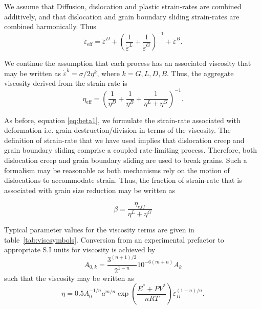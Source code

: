 \documentclass[a4paper]{article}
\newcommand{\strr}{\dot{\varepsilon}}
\begin{document}
We assume that Diffusion, dislocation and plastic strain-rates are combined additively, and that dislocation and grain boundary sliding strain-rates are combined harmonically.
Thus
\begin{equation}
  \strr_\text{eff} = \strr^D +  \left( \frac{1}{\strr^L} +\frac{1}{\strr^G} \right)^{-1} + \strr^B.
\end{equation}

We continue the assumption that each process has an associated viscosity that may be written as $\strr^k = \sigma / 2 \eta^k$, where $k = G, L, D, B$.
Thus, the aggregate viscosity derived from the strain-rate is
\begin{equation}
  \eta_\text{eff} = \left( \frac{1}{\eta^D} + \frac{1}{\eta^B} + \frac{1}{\eta^L + \eta^G} \right)^{-1}.
\end{equation}

As before, equation \ref{eq:beta1}, we formulate the strain-rate associated with deformation i.e. grain destruction/division in terms of the viscosity.
The definition of strain-rate that we have used implies that dislocation creep and grain boundary sliding comprise a coupled rate-limiting process.
Therefore, both dislocation creep and grain boundary sliding are used to break grains.
Such a formalism may be reasonable as both mechanisms rely on the motion of dislocations to accommodate strain.
Thus, the fraction of strain-rate that is associated with grain size reduction may be written as 

 \begin{equation}
  \beta = \frac{\eta_{eff}}{\eta^L + \eta^G}
  \label{eq:beta2}
\end{equation}
 

Typical parameter values for the viscosity terms are given in table~\ref{tab:viscsymbols}.
Conversion from an experimental prefactor to appropriate S.I units for viscosity is achieved by
 \begin{equation}
  A_{0,k} = \frac{3^{(n+1)/2}}{2^{1-n}}10^{-6(m+n)}A_k
  \label{eq:convert}
\end{equation}
such that the viscosity may be written as 
\begin{equation*}
  \eta = 0.5A_0^{-1/n}a^{m/n}\exp\left(\frac{E^* + PV^*}{nRT}\right)\strr^{(1-n)/n}_{II}.
\end{equation*}
\end{document}

